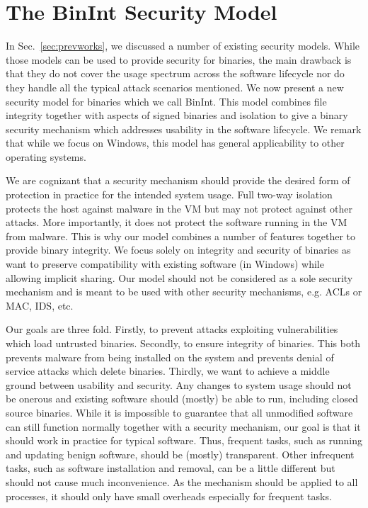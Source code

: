 \section{The BinInt Security Model}
\label{sec:binint}

In Sec.~\ref{sec:prevworks}, we discussed a number of existing
security models. While those models can be used to provide security
for binaries, the main drawback is that they do not cover the usage spectrum
across the software lifecycle nor do they handle all the
typical attack scenarios mentioned.
We now present a new security model for binaries
which we call BinInt.
This model combines file integrity together with
aspects of signed binaries and isolation to give a binary
security mechanism which 
addresses usability in the software lifecycle. We remark
that while we focus on Windows, this model has general applicability
to other operating systems.

We are cognizant that a security mechanism
should provide the desired form of protection in practice for
the intended system usage.
Full two-way isolation protects the host
against malware in the VM but may not
protect against other attacks.
More importantly, it does not protect the software running 
in the VM from malware.
This is why our model combines a number of features together to provide
binary integrity. 
We focus solely on integrity and security of binaries
as want to preserve compatibility with existing
software (in Windows) while allowing implicit sharing.
Our model should not be considered as a sole security mechanism and
is meant to be used with other security mechanisms, 
e.g. ACLs or MAC, IDS, etc.

Our goals are three fold.
Firstly, to prevent attacks exploiting vulnerabilities which load 
untrusted binaries.
Secondly, to ensure integrity of binaries.
This both prevents malware from being installed on the system and 
prevents denial of service attacks which delete binaries.
Thirdly, we want to achieve a middle ground
between usability and security.
Any changes to system usage should not be onerous and existing software 
should (mostly) be able to run, including closed source binaries.
While it is impossible to guarantee that all unmodified software can still
function normally together with a security mechanism, our goal is that
it should work in practice for typical software.
Thus, frequent tasks, such as running and updating benign software, 
should be (mostly) transparent.
Other infrequent tasks, such as software installation and removal, 
can be a little different but should not cause much inconvenience.
As the mechanism should be applied to all processes, 
it should only have small overheads especially for frequent tasks.

